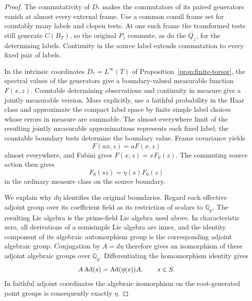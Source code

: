 \begin{proof}
The commutativity of $D_*$ makes the commutators of its paired
generators vanish at almost every external frame.  Use a common
conull frame set for countably many labels and clopen tests.
At one such frame the transformed tests still generate
$C(B_T)$, so the original $P_z$ commute, as do the $Q_z$, for
the determining labels.  Continuity in the source label extends
commutation to every fixed pair of labels.

In the intrinsic coordinates $D_*=L^\infty(T)$ of
Proposition~\ref{prop:finite-torsor}, the spectral values of the
generators give a boundary-valued measurable function $F(x,z)$.
Countable determining observations and continuity in measure
give a jointly measurable version.  More explicitly, use a
faithful probability in the Haar class and approximate the compact
label space by finite simple label choices whose errors in measure
are summable.  The almost-everywhere limit of the resulting
jointly measurable approximations represents each fixed label;
the countable boundary tests determine the boundary value.
Frame covariance yields
\[
 F(ax,z)=aF(x,z)
\]
almost everywhere, and Fubini gives $F(x,z)=xF_0(z)$.
The commuting source action then gives
\begin{equation}
 F_0(sz)=\eta(s)F_0(z)
 \label{eq:finite-equivariant-map}
\end{equation}
in the ordinary measure class on the source boundary.

We explain why $d\eta$ identifies the original boundaries.
Regard each effective adjoint group over its coefficient field
as its restriction of scalars to $\mathbb Q_p$.
The resulting Lie algebra is the prime-field Lie algebra used
above.  In characteristic zero, all derivations of a semisimple
Lie algebra are inner, and the identity component of its
algebraic automorphism group is the corresponding adjoint
algebraic group.  Conjugation by $A=d\eta$ therefore gives an
isomorphism of these adjoint algebraic groups over $\mathbb Q_p$.
Differentiating the homomorphism identity gives
\begin{equation}
 A\operatorname{Ad}(s)=\operatorname{Ad}(\eta(s))A,\qquad s\in S.
 \label{eq:finite-adjoint-intertwining}
\end{equation}
In faithful adjoint coordinates the algebraic isomorphism on
the root-generated point groups is consequently exactly $\eta$.


\end{proof}
